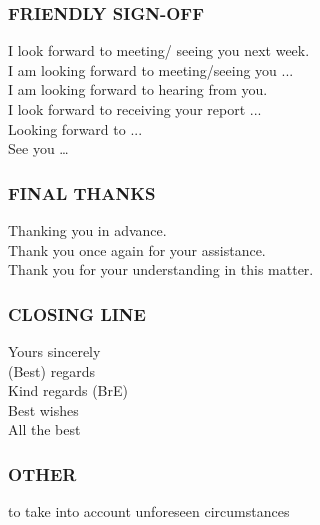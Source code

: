 \subsubsection{FRIENDLY SIGN-OFF}
I look forward to meeting/ seeing you next week.\\
I am looking forward to meeting/seeing you ...\\
I am looking forward to hearing from you.\\
I look forward to receiving your report ...\\
Looking forward to ...\\
See you …\\
\subsubsection{FINAL THANKS}
Thanking you in advance.\\
Thank you once again for your assistance.\\
Thank you for your understanding in this matter.\\
\subsubsection{CLOSING LINE}
Yours sincerely\\
(Best) regards\\
Kind regards (BrE)\\
Best wishes\\
All the best\\
\subsubsection{OTHER}
to take into account unforeseen circumstances\\